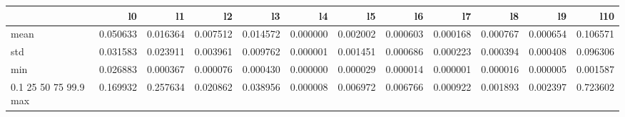 \begin{tabular}{lrrrrrrrrrrr}
\toprule
 & l0 & l1 & l2 & l3 & l4 & l5 & l6 & l7 & l8 & l9 & l10 \\
\midrule
mean & 0.050633 & 0.016364 & 0.007512 & 0.014572 & 0.000000 & 0.002002 & 0.000603 & 0.000168 & 0.000767 & 0.000654 & 0.106571 \\
std & 0.031583 & 0.023911 & 0.003961 & 0.009762 & 0.000001 & 0.001451 & 0.000686 & 0.000223 & 0.000394 & 0.000408 & 0.096306 \\
min & 0.026883 & 0.000367 & 0.000076 & 0.000430 & 0.000000 & 0.000029 & 0.000014 & 0.000001 & 0.000016 & 0.000005 & 0.001587 \\
0.1%
25%
50%
75%
99.9%
max & 0.169932 & 0.257634 & 0.020862 & 0.038956 & 0.000008 & 0.006972 & 0.006766 & 0.000922 & 0.001893 & 0.002397 & 0.723602 \\
\bottomrule
\end{tabular}

